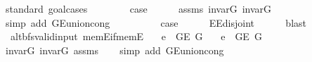 \begin{isabellebody}
\endisataginvisible
{\isafoldinvisible}%
%
\isadeliminvisible
\isanewline
%
\endisadeliminvisible
%
\isadelimproof
%
\endisadelimproof
%
\isatagproof
{}\isamarkupfalse%
\ {\isacharparenleft}{\kern0pt}standard{\isacharcomma}{\kern0pt}\ goal{\isacharunderscore}{\kern0pt}cases{\isacharparenright}{\kern0pt}\isanewline
\ \ \isamarkupfalse%
\ {}\isanewline
\ \ \isamarkupfalse%
\ {\isacharquery}{\kern0pt}case\isanewline
\ \ \ \ \isamarkupfalse%
\ assms\ invar{\isacharunderscore}{\kern0pt}G{}\ invar{\isacharunderscore}{\kern0pt}G{}\isanewline
\ \ \ \ \isamarkupfalse%
\ {\isacharparenleft}{\kern0pt}simp\ add{\isacharcolon}{\kern0pt}\ G{\isachardot}{\kern0pt}E{\isacharunderscore}{\kern0pt}union{\isacharunderscore}{\kern0pt}cong{\isacharparenright}{\kern0pt}\isanewline
{}\isamarkupfalse%
\isanewline
\ \ \isamarkupfalse%
\ {}\isanewline
\ \ \isamarkupfalse%
\ \isamarkupfalse%
\ {\isacharquery}{\kern0pt}case\isanewline
\ \ \ \ \isamarkupfalse%
\ E{}{\isacharunderscore}{\kern0pt}E{}{\isacharunderscore}{\kern0pt}disjoint\isanewline
\ \ \ \ \isamarkupfalse%
\ blast\isanewline
{}\isamarkupfalse%
%
\endisatagproof
{\isafoldproof}%
%
\isadelimproof
\isanewline
%
\endisadelimproof
%
\isadeliminvisible
\isanewline
%
\endisadeliminvisible
%
\isataginvisible
{}\isamarkupfalse%
\ {\isacharparenleft}{\kern0pt}\ alt{\isacharunderscore}{\kern0pt}bfs{\isacharunderscore}{\kern0pt}valid{\isacharunderscore}{\kern0pt}input{\isacharparenright}{\kern0pt}\ mem{\isacharunderscore}{\kern0pt}E{\isacharunderscore}{\kern0pt}if{\isacharunderscore}{\kern0pt}mem{\isacharunderscore}{\kern0pt}E{}{\isacharcolon}{\kern0pt}\isanewline
\ \ \ {\isachardoublequoteopen}e\ {\isasymin}\ G{\isachardot}{\kern0pt}E\ G{}{\isachardoublequoteclose}\isanewline
\ \ \ {\isachardoublequoteopen}e\ {\isasymin}\ G{\isachardot}{\kern0pt}E\ G{\isachardoublequoteclose}%
\endisataginvisible
{\isafoldinvisible}%
%
\isadeliminvisible
\isanewline
%
\endisadeliminvisible
%
\isadelimproof
\ \ %
\endisadelimproof
%
\isatagproof
{}\isamarkupfalse%
\ invar{\isacharunderscore}{\kern0pt}G{}\ invar{\isacharunderscore}{\kern0pt}G{}\ assms\isanewline
\ \ \isamarkupfalse%
\ {\isacharparenleft}{\kern0pt}simp\ add{\isacharcolon}{\kern0pt}\ G{\isachardot}{\kern0pt}E{\isacharunderscore}{\kern0pt}union{\isacharunderscore}{\kern0pt}cong{\isacharparenright}{\kern0pt}%

\end{isabellebody}
